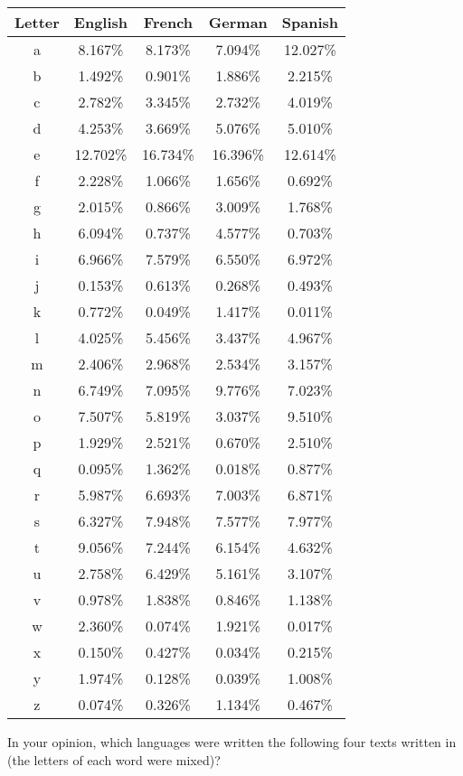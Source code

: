 \documentclass[11pt,class=report,crop=false]{standalone}
\begin{document}
\begin{activite}
\begin{enumerate}
\begin{center}
\begin{tabular}{|c||c|c|c|c|} 
\hline
Letter & English & French & German & Spanish \\ \hline\hline
a&8.167\%&8.173\%&7.094\%&12.027\% \\
b&1.492\%&0.901\%&1.886\%&2.215\% \\
c&2.782\%&3.345\%&2.732\%&4.019\% \\
d&4.253\%&3.669\%&5.076\%&5.010\% \\
e&12.702\%&16.734\%&16.396\%&12.614\% \\
f&2.228\%&1.066\%&1.656\%&0.692\% \\
g&2.015\%&0.866\%&3.009\%&1.768\% \\
h&6.094\%&0.737\%&4.577\%&0.703\% \\
i&6.966\%&7.579\%&6.550\%&6.972\% \\
j&0.153\%&0.613\%&0.268\%&0.493\% \\
k&0.772\%&0.049\%&1.417\%&0.011\% \\
l&4.025\%&5.456\%&3.437\%&4.967\% \\
m&2.406\%&2.968\%&2.534\%&3.157\% \\
n&6.749\%&7.095\%&9.776\%&7.023\% \\
o&7.507\%&5.819\%&3.037\%&9.510\% \\
p&1.929\%&2.521\%&0.670\%&2.510\% \\
q&0.095\%&1.362\%&0.018\%&0.877\% \\
r&5.987\%&6.693\%&7.003\%&6.871\% \\
s&6.327\%&7.948\%&7.577\%&7.977\% \\
t&9.056\%&7.244\%&6.154\%&4.632\% \\
u&2.758\%&6.429\%&5.161\%&3.107\% \\
v&0.978\%&1.838\%&0.846\%&1.138\% \\
w&2.360\%&0.074\%&1.921\%&0.017\% \\
x&0.150\%&0.427\%&0.034\%&0.215\% \\
y&1.974\%&0.128\%&0.039\%&1.008\% \\
z&0.074\%&0.326\%&1.134\%&0.467\% \\ 
\hline
\end{tabular} 
\end{center}

\bigskip

In your opinion, which languages were written the following four texts written in (the letters of each word were mixed)?


\end{enumerate}
\end{activite}
\end{document}
